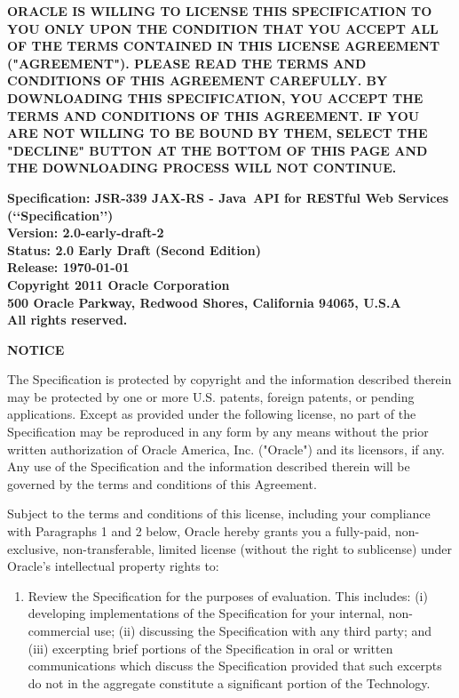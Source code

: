 \begin{flushleft}

{\bfseries ORACLE IS WILLING TO LICENSE THIS SPECIFICATION TO YOU ONLY UPON THE CONDITION THAT YOU ACCEPT ALL OF THE TERMS CONTAINED IN THIS LICENSE AGREEMENT ("AGREEMENT"). PLEASE READ THE TERMS AND CONDITIONS OF THIS AGREEMENT CAREFULLY. BY DOWNLOADING THIS SPECIFICATION, YOU ACCEPT THE TERMS AND CONDITIONS OF THIS AGREEMENT. IF YOU ARE NOT WILLING TO BE BOUND BY THEM, SELECT THE "DECLINE" BUTTON AT THE BOTTOM OF THIS PAGE AND THE DOWNLOADING PROCESS WILL NOT CONTINUE.}

{\bfseries Specification: JSR-339 JAX-RS - Java\texttrademark\ API for RESTful Web Services (\lq\lq Specification\rq\rq)\\
Version: 2.0-early-draft-2\\
Status: 2.0 Early Draft (Second Edition)\\
Release: \today\\ 
Copyright 2011 Oracle Corporation\\
500 Oracle Parkway, Redwood Shores, California 94065, U.S.A\\ 
All rights reserved.
}

{\bfseries NOTICE}

The Specification is protected by copyright and the information described therein may be protected by one or more U.S. patents, foreign patents, or pending applications. Except as provided under the following license, no part of the Specification may be reproduced in any form by any means without the prior written authorization of Oracle America, Inc. ("Oracle") and its licensors, if any. Any use of the Specification and the information described therein will be governed by the terms and conditions of this Agreement. 

Subject to the terms and conditions of this license, including your compliance with Paragraphs 1 and 2 below, Oracle hereby grants you a fully-paid, non-exclusive, non-transferable, limited license (without the right to sublicense) under Oracle's intellectual property rights to:

\begin{enumerate}
\item Review the Specification for the purposes of evaluation. This includes: (i) developing implementations of the Specification for your internal, non-commercial use; (ii) discussing the Specification with any third party; and (iii) excerpting brief portions of the Specification in oral or written communications which discuss the Specification provided that such excerpts do not in the aggregate constitute a significant portion of the Technology.


\end{enumerate}
\end{flushleft}
